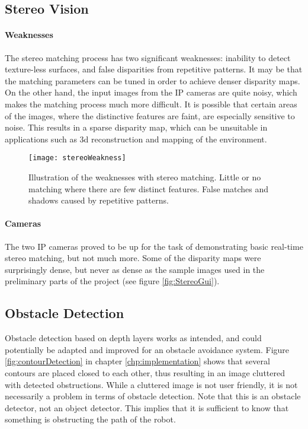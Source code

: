 \subsection{Stereo Vision}

\paragraph{Weaknesses}

The stereo matching process has two significant weaknesses: inability to detect texture-less surfaces, and false disparities from repetitive patterns. It may be that the matching parameters can be tuned in order to achieve denser disparity maps. On the other hand, the input images from the IP cameras are quite noisy, which makes the matching process much more difficult. It is possible that certain areas of the images, where the distinctive features are faint, are especially sensitive to noise. This results in a sparse disparity map, which can be unsuitable in applications such as 3d reconstruction and mapping of the environment.

\begin{figure}
	\texttt{[image: stereoWeakness]}
	\caption{Illustration of the weaknesses with stereo matching. Little or no matching where there are few distinct features. False matches and shadows caused by repetitive patterns.}
	\label{fig:stereoWeakness}
\end{figure}

\paragraph{Cameras}

The two IP cameras proved to be up for the task of demonstrating basic real-time stereo matching, but not much more. Some of the disparity maps were surprisingly dense, but never as dense as the sample images used in the preliminary parts of the project (see figure \ref{fig:StereoGui}).

\subsection{Obstacle Detection}

Obstacle detection based on depth layers works as intended, and could potentially be adapted and improved for an obstacle avoidance system. Figure \ref{fig:contourDetection} in chapter \ref{chp:implementation} shows that several contours are placed closed to each other, thus resulting in an image cluttered with detected obstructions. While a cluttered image is not user friendly, it is not necessarily a problem in terms of obstacle detection. Note that this is an obstacle detector, not an object detector. This implies that it is sufficient to know that something is obstructing the path of the robot. 

